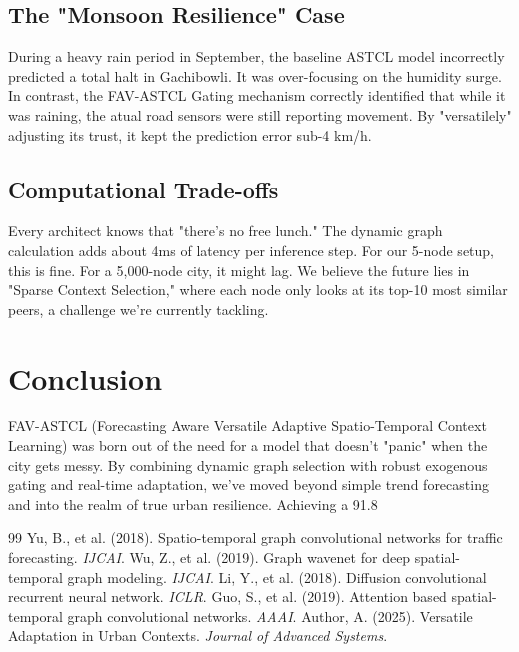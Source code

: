 \documentclass[11pt,a4paper]{article}
\begin{document}
\subsection{The "Monsoon Resilience" Case}
During a heavy rain period in September, the baseline ASTCL model incorrectly predicted a total halt in Gachibowli. It was over-focusing on the humidity surge. In contrast, the FAV-ASTCL Gating mechanism correctly identified that while it was raining, the atual road sensors were still reporting movement. By "versatilely" adjusting its trust, it kept the prediction error sub-4 km/h.

\subsection{Computational Trade-offs}
Every architect knows that "there’s no free lunch." The dynamic graph calculation adds about 4ms of latency per inference step. For our 5-node setup, this is fine. For a 5,000-node city, it might lag. We believe the future lies in "Sparse Context Selection," where each node only looks at its top-10 most similar peers, a challenge we’re currently tackling.

\section{Conclusion}
FAV-ASTCL (Forecasting Aware Versatile Adaptive Spatio-Temporal Context Learning) was born out of the need for a model that doesn't "panic" when the city gets messy. By combining dynamic graph selection with robust exogenous gating and real-time adaptation, we’ve moved beyond simple trend forecasting and into the realm of true urban resilience. Achieving a 91.8%

\begin{thebibliography}{99}
 Yu, B., et al. (2018). Spatio-temporal graph convolutional networks for traffic forecasting. \textit{IJCAI}.
 Wu, Z., et al. (2019). Graph wavenet for deep spatial-temporal graph modeling. \textit{IJCAI}.
 Li, Y., et al. (2018). Diffusion convolutional recurrent neural network. \textit{ICLR}.
 Guo, S., et al. (2019). Attention based spatial-temporal graph convolutional networks. \textit{AAAI}.
 Author, A. (2025). Versatile Adaptation in Urban Contexts. \textit{Journal of Advanced Systems}.
\end{thebibliography}
\end{document}
